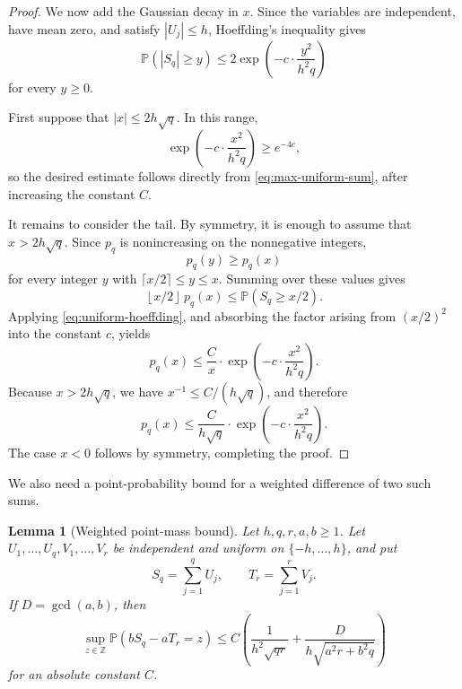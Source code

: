 \documentclass[11pt]{article}
\theoremstyle{plain}
\newtheorem{lemma}{Lemma}[section]
\theoremstyle{definition}
\theoremstyle{remark}
\newcommand{\Z}{\mathbb Z}
\newcommand{\Prob}{\mathbb P}
\newcommand{\floor}[1]{\left\lfloor #1\right\rfloor}
\begin{document}
\begin{proof}
We now add the Gaussian decay in $x$. Since the variables are independent,
have mean zero, and satisfy $|U_j|\le h$, Hoeffding's inequality \cite{Hoeffding1963} gives
\begin{equation}\label{eq:uniform-hoeffding}
        \Prob(|S_q|\ge y)
        \le
        2\exp\left(-c\cdot\frac{y^2}{h^2q}\right)
\end{equation}
for every $y\ge0$.

First suppose that $|x|\le2h\sqrt q$. In this range,
\[
        \exp\left(-c\cdot\frac{x^2}{h^2q}\right)
        \ge e^{-4c},
\]
so the desired estimate follows directly from
\eqref{eq:max-uniform-sum}, after increasing the constant $C$.

It remains to consider the tail. By symmetry, it is enough to assume that
$x>2h\sqrt q$. Since $p_q$ is nonincreasing on the nonnegative integers,
\[
        p_q(y)\ge p_q(x)
\]
for every integer $y$ with $\lceil x/2\rceil\le y\le x$. Summing over these
values gives
\[
        \floor{x/2}\,p_q(x)
        \le \Prob(S_q\ge x/2).
\]
Applying \eqref{eq:uniform-hoeffding}, and absorbing the factor arising
from $(x/2)^2$ into the constant $c$, yields
\[
        p_q(x)
        \le
        \frac{C}{x}\cdot
        \exp\left(-c\cdot\frac{x^2}{h^2q}\right).
\]
Because $x>2h\sqrt q$, we have $x^{-1}\le C/(h\sqrt q)$, and therefore
\[
        p_q(x)
        \le
        \frac{C}{h\sqrt q}\cdot
        \exp\left(-c\cdot\frac{x^2}{h^2q}\right).
\]
The case $x<0$ follows by symmetry, completing the proof.
\end{proof}

We also need a point-probability bound for a weighted difference of two such sums.

\begin{lemma}[Weighted point-mass bound]\label{lem:weighted-uniform-sums}
Let $h,q,r,a,b\ge1$. Let $U_1,\ldots,U_q,V_1,\ldots,V_r$ be independent and uniform on $\{-h,\ldots,h\}$, and put
\[
        S_q=\sum_{j=1}^qU_j,
        \qquad
        T_r=\sum_{j=1}^rV_j.
\]
If $D=\gcd(a,b)$, then
\begin{equation}\label{eq:weighted-uniform-sums}
 \sup_{z\in\Z}\Prob(bS_q-aT_r=z)
 \le C\left(
        \frac{1}{h^2\sqrt{qr}}
        +\frac{D}{h\sqrt{a^2r+b^2q}}
 \right)
\end{equation}
for an absolute constant $C$.
\end{lemma}
\end{document}
